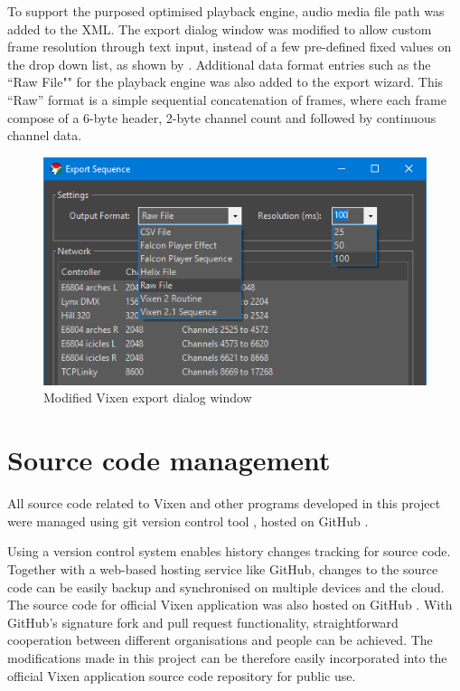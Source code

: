 To support the purposed optimised playback engine, audio media file path was added to the XML. The export dialog window was modified to allow custom frame resolution through text input, instead of a few pre-defined fixed values on the drop down list, as shown by . Additional data format entries such as the ``Raw File"" for the playback engine was also added to the export wizard. This ``Raw'' format is a simple sequential concatenation of frames, where each frame compose of a 6-byte header, 2-byte channel count and followed by continuous channel data.

\begin{figure}[t]
  \centering
  \includegraphics[width=0.75\columnwidth]{Figs/vixen_export.png}
  \caption{Modified Vixen export dialog window}
  \label{fig:vixen_export}
\end{figure}

\section{Source code management}

All source code related to Vixen and other programs developed in this project were managed using git version control tool \cite{git}, hosted on GitHub \cite{github} \cite{github_vixen_yz} \cite{github_project}.

Using a version control system enables history changes tracking for source code. Together with a web-based hosting service like GitHub, changes to the source code can be easily backup and synchronised on multiple devices and the cloud. The source code for official Vixen application was also hosted on GitHub \cite{github_vixen}. With GitHub's signature fork and pull request functionality, straightforward cooperation between different organisations and people can be achieved. The modifications made in this project can be therefore easily incorporated into the official Vixen application source code repository for public use.

